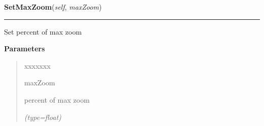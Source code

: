     \label{ImagePanel:ImagePanel:SetMaxZoom}

    \vspace{0.5ex}

\hspace{.8\funcindent}\begin{boxedminipage}{\funcwidth}

    \raggedright \textbf{SetMaxZoom}(\textit{self}, \textit{maxZoom})

    \vspace{-1.5ex}

    \rule{\textwidth}{0.5\fboxrule}
\setlength{\parskip}{2ex}
    Set percent of max zoom

\setlength{\parskip}{1ex}
      \textbf{Parameters}
      \vspace{-1ex}

      \begin{quote}
        \begin{Ventry}{xxxxxxx}

          \item[maxZoom]

          percent of max zoom

            {\it (type=float)}

        \end{Ventry}

      \end{quote}

    \end{boxedminipage}

    \label{ImagePanel:ImagePanel:SetMinZoom}

    \vspace{0.5ex}


